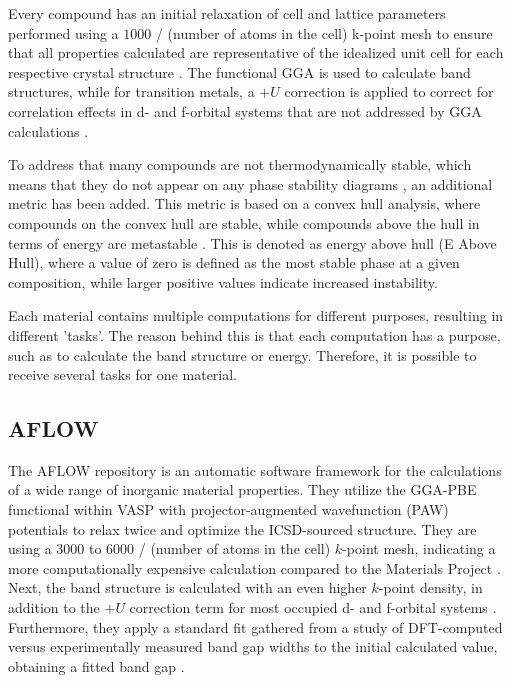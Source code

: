
Every compound has an initial relaxation of cell and lattice parameters performed using a $1000$ / (number of atoms in the cell) k-point mesh to ensure that all properties calculated are representative of the idealized unit cell for each respective crystal structure \cite{Ferrenti2020}. The functional GGA is used to calculate band structures, while for transition metals, a $+U$ correction is applied to correct for correlation effects in d- and f-orbital systems that are not addressed by GGA calculations \cite{Wang2006}.

To address that many compounds are not thermodynamically stable, which means that they do not appear on any phase stability diagrams \cite{Sun2016}, an additional metric has been added. This metric is based on a convex hull analysis, where compounds on the convex hull are stable, while compounds above the hull in terms of energy are metastable \cite{Jain2018}. This is denoted as energy above hull (E Above Hull), where a value of zero is defined as the most stable phase at a given composition, while larger positive values indicate increased instability.

Each material contains multiple computations for different purposes, resulting in different 'tasks'. The reason behind this is that each computation has a purpose, such as to calculate the band structure or energy. Therefore, it is possible to receive several tasks for one material.

\subsection{AFLOW}

The AFLOW\cite{Curtarolo2012, Curtarolo2012a, Calderon2015} repository is an automatic software framework for the calculations of a wide range of inorganic material properties. They utilize the GGA-PBE functional within VASP with projector-augmented wavefunction (PAW) potentials to relax twice and optimize the ICSD-sourced structure. They are using a $3000$ to $6000$ / (number of atoms in the cell) $k$-point mesh, indicating a more computationally expensive calculation compared to the Materials Project \cite{Ferrenti2020}.
Next, the band structure is calculated with an even higher $k$-point density, in addition to the $+U$ correction term for most occupied d- and f-orbital systems \cite{Setyawan2010}. Furthermore, they apply a standard fit gathered from a study of DFT-computed versus experimentally measured band gap widths to the initial calculated value, obtaining a fitted band gap \cite{Setyawan2011}.


